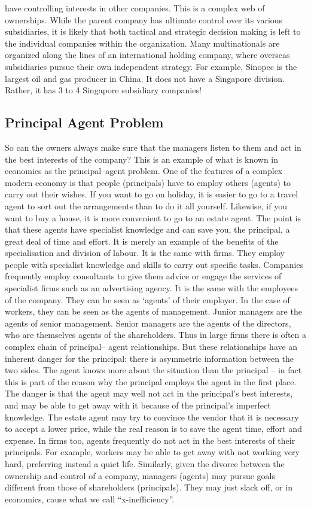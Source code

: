 \documentclass[DIV=classic,11pt,numbers=noenddot,listof=totoc,bibliography=totoc,parskip]{scrartcl}
\begin{document}
have controlling interests in other companies. This is a complex web of ownerships. While the parent company has ultimate control over its various subsidiaries, it is likely that both tactical and strategic decision making is left to the individual companies within the organization. Many multinationals are organized along the lines of an international holding company, where overseas subsidiaries pursue their own independent strategy. For example, Sinopec is the largest oil and gas producer in China. It does not have a Singapore division. Rather, it has 3 to 4 Singapore subsidiary companies!
\subsection{Principal Agent Problem}
 So can the owners always make sure that the managers listen to them and act in the best interests of the company? This is an example of what is known in economics as the principal–agent problem. One of the features of a complex modern economy is that people (principals) have to employ others (agents) to carry out their wishes. If you want to go on holiday, it is easier to go to a travel agent to sort out the arrangements than to do it all yourself. Likewise, if you want to buy a house, it is more convenient to go to an estate agent. The point is that these agents have specialist knowledge and can save you, the principal, a great deal of time and effort. It is merely an example of the benefits of the specialisation and division of labour. It is the same with firms. They employ people with specialist knowledge and skills to carry out specific tasks. Companies frequently employ consultants to give them advice or engage the services of specialist firms such as an advertising agency. It is the same with the employees of the company. They can be seen as ‘agents’ of their employer. In the case of workers, they can be seen as the agents of management. Junior managers are the agents of senior management. Senior managers are the agents of the directors, who are themselves agents of the shareholders. Thus in large firms there is often a complex chain of principal– agent relationships. But these relationships have an inherent danger for the principal: there is asymmetric information between the two sides. The agent knows more about the situation than the principal – in fact this is part of the reason why the principal employs the agent in the first place. The danger is that the agent may well not act in the principal’s best interests, and may be able to get away with it because of the principal’s imperfect knowledge. The estate agent may try to convince the vendor that it is necessary to accept a lower price, while the real reason is to save the agent time, effort and expense. In firms too, agents frequently do not act in the best interests of their principals. For example, workers may be able to get away with not working very hard, preferring instead a quiet life. Similarly, given the divorce between the ownership and control of a company, managers (agents) may pursue goals different from those of shareholders (principals). They may just slack off, or in economics, cause what we call “x-inefficiency”.
\end{document}
